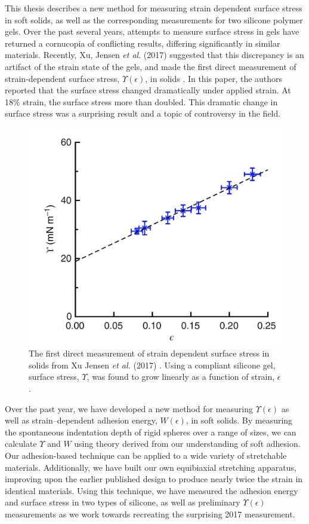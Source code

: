 This thesis describes a new method for measuring strain dependent surface stress in soft solids, as well as the corresponding measurements for two silicone polymer gels. Over the past several years, attempts to measure surface stress in gels have returned a cornucopia of conflicting results, differing significantly in similar materials. Recently, Xu, Jensen \textit{et al}. (2017) suggested that this discrepancy is an artifact of the strain state of the gels, and made the first direct measurement of strain-dependent surface stress, $\Upsilon(\epsilon)$, in solids \cite{xu2017direct}. In this paper, the authors reported that the surface stress changed dramatically under applied strain. At 18\% strain, the surface stress more than doubled. This dramatic change in surface stress was a surprising result and a topic of controversy in the field. 
\begin{figure}[h!]
	\centering
	\includegraphics[width=0.69\linewidth]{Chapters/Figures/2017natcomfig}
	\caption[Surface Stress vs. Strain in Silicone]{The first direct measurement of strain dependent surface stress in solids from Xu Jensen \textit{et al.} (2017) \cite{xu2017direct}. Using a compliant silicone gel, surface stress, $\Upsilon$, was found to grow linearly as a function of strain, $ \epsilon $.}
	\label{fig:2017natcomfig}
\end{figure}

Over the past year, we have developed a new method for measuring $\Upsilon(\epsilon)$ as well as strain--dependent adhesion energy, $ W(\epsilon) $, in soft solids. By measuring the spontaneous indentation depth of rigid spheres over a range of sizes, we can calculate $ \Upsilon $ and $ W $ using theory derived from our understanding of soft adhesion. Our adhesion-based technique can be applied to a wide variety of stretchable materials. Additionally, we have built our own equibiaxial stretching apparatus, improving upon the earlier published design \cite{xu2017direct} to produce nearly twice the strain in identical materials. Using this technique, we have measured the adhesion energy and surface stress in two types of silicone, as well as preliminary $ \Upsilon(\epsilon) $ measurements as we work towards recreating the surprising 2017 measurement.

